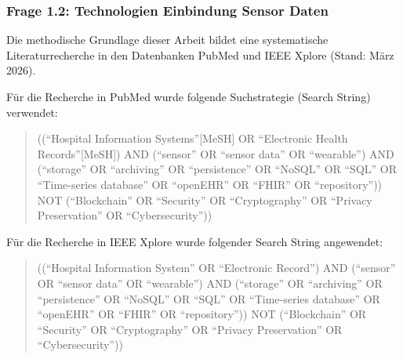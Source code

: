 \subsubsection{Frage 1.2: Technologien Einbindung Sensor Daten}
\begin{description}[style=nextline, font=\bfseries]

    \item[Methodik] 
    Die methodische Grundlage dieser Arbeit bildet eine systematische Literaturrecherche in den Datenbanken PubMed und IEEE Xplore (Stand: März 2026). 
    
    Für die Recherche in PubMed wurde folgende Suchstrategie (Search String) verwendet:
    
    \begin{quote}
    ((\enquote{Hospital Information Systems}[MeSH] OR \enquote{Electronic Health Records}[MeSH]) 
    AND (\enquote{sensor\textasteriskcentered} OR \enquote{sensor data} OR \enquote{wearable\textasteriskcentered}) 
    AND (\enquote{storage} OR \enquote{archiving} OR \enquote{persistence} OR \enquote{NoSQL} OR \enquote{SQL} OR \enquote{Time-series database} OR \enquote{openEHR} OR \enquote{FHIR} OR \enquote{repository})) 
    NOT (\enquote{Blockchain} OR \enquote{Security} OR \enquote{Cryptography} OR \enquote{Privacy Preservation} OR \enquote{Cybersecurity}))
    \end{quote}
    
    Für die Recherche in IEEE Xplore wurde folgender Search String angewendet:
    
    \begin{quote}
    ((\enquote{Hospital Information System\textasteriskcentered} OR \enquote{Electronic Record\textasteriskcentered}) 
    AND (\enquote{sensor\textasteriskcentered} OR \enquote{sensor data} OR \enquote{wearable\textasteriskcentered}) 
    AND (\enquote{storage} OR \enquote{archiving} OR \enquote{persistence} OR \enquote{NoSQL} OR \enquote{SQL} OR \enquote{Time-series database} OR \enquote{openEHR} OR \enquote{FHIR} OR \enquote{repository})) 
    NOT (\enquote{Blockchain} OR \enquote{Security} OR \enquote{Cryptography} OR \enquote{Privacy Preservation} OR \enquote{Cybersecurity}))
    \end{quote}
    

\end{description}
